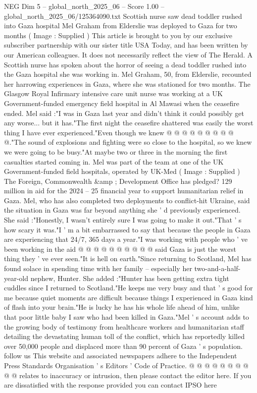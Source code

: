 \begin{textsample}{NEG Dim 5 – global\_north\_2025\_06 – Score 1.00 – global\_north\_2025\_06/125364090.txt}  \label{ex:f5_neg_383}
Scottish nurse saw dead toddler rushed into Gaza hospital Mel Graham from Elderslie was deployed to Gaza for two months ( Image : Supplied ) This article is brought to you by our exclusive subscriber partnership with our sister title USA Today, and has been written by our American colleagues.
It does not necessarily reflect the view of The Herald.
A Scottish nurse has spoken about the horror of seeing a dead toddler rushed into the Gaza hospital she was working in.
Mel Graham, 50, from Elderslie, recounted her harrowing experiences in Gaza, where she was stationed for two months.
The Glasgow Royal Infirmary intensive care unit nurse was working at a UK Government-funded emergency field hospital in Al Mawasi when the ceasefire ended.
Mel said :"I was in Gaza last year and didn't think it could possibly get any worse... but it has."The first night the ceasefire shattered was easily the worst thing I have ever experienced."Even though we knew @ @ @ @ @ @ @ @ @ @."The sound of explosions and fighting were so close to the hospital, so we knew we were going to be busy."At maybe two or three in the morning the first casualties started coming in.
Mel was part of the team at one of the UK Government-funded field hospitals, operated by UK-Med ( Image : Supplied ) The Foreign, Commonwealth \&amp ; Development Office has pledged? 129 million in aid for the 2024 -- 25 financial year to support humanitarian relief in Gaza.
Mel, who has also completed two deployments to conflict-hit Ukraine, said the situation in Gaza was far beyond anything she ' d previously experienced.
She said :"Honestly, I wasn't entirely sure I was going to make it out."That ' s how scary it was."I ' m a bit embarrassed to say that because the people in Gaza are experiencing that 24/7, 365 days a year."I was working with people who ' ve been working in the aid @ @ @ @ @ @ @ @ @ @ said Gaza is just the worst thing they ' ve ever seen."It is hell on earth."Since returning to Scotland, Mel has found solace in spending time with her family -- especially her two-and-a-half-year-old nephew, Hunter.
She added :"Hunter has been getting extra tight cuddles since I returned to Scotland."He keeps me very busy and that ' s good for me because quiet moments are difficult because things I experienced in Gaza kind of flash into your brain."He is lucky he has his whole life ahead of him, unlike that poor little baby I saw who had been killed in Gaza."Mel ' s account adds to the growing body of testimony from healthcare workers and humanitarian staff detailing the devastating human toll of the conflict, which has reportedly killed over 50,000 people and displaced more than 90 percent of Gaza ' s population. follow us This website and associated newspapers adhere to the Independent Press Standards Organisation ' s Editors ' Code of Practice. @ @ @ @ @ @ @ @ @ @ relates to inaccuracy or intrusion, then please contact the editor here.
If you are dissatisfied with the response provided you can contact IPSO here

\end{textsample}
